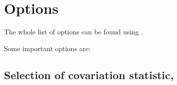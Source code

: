 
\section{Options}
\label{section:options}
\setcounter{footnote}{0}

The whole list of options can be found using .

Some important options are:

\subsection{Selection of covariation statistic, }

\subsection{}

\subsection{}

\subsection{}

\subsection{}


\subsection{}

\subsection{}

\subsection{}













